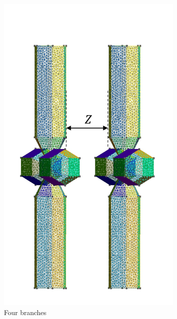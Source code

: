 \begin{figure}[H]
\begin{subfigure}{0.3\linewidth}
                \includegraphics[scale = 0.38]{figures/4branches}
                \caption{Four branches}
                \end{subfigure}\\[1ex]
    \begin{subfigure}{.5\linewidth}
    \centering

\end{subfigure}
\end{figure}

